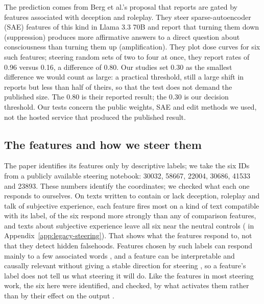\documentclass[11pt]{article}
\begin{document}
The prediction comes from Berg et al.'s proposal that reports are gated by
features associated with deception and roleplay. They steer
sparse-autoencoder (SAE) features of this kind in
Llama 3.3 70B and report that turning them down (suppression) produces more
affirmative answers
to a direct question about consciousness than turning them up
(amplification). They plot dose curves for six such features; steering
random sets of two to four at once, they report rates of 0.96 versus 0.16, a
difference of 0.80. Our studies set 0.30 as the smallest
difference we would count as large: a practical threshold, still a large
shift in reports but less than half of theirs, so that the test does not
demand the published size. The 0.80 is their reported result; the 0.30 is
our decision threshold. Our tests concern the public weights, SAE and edit
methods we used, not the hosted service that produced the published result.

\subsection{The features and how we steer them}

The paper identifies its features only by descriptive labels; we take the six
IDs from a publicly available steering notebook:
30032, 58667, 22004, 30686, 41533 and 23893. These numbers identify the
coordinates; we checked what each one responds to ourselves. On
\FeatureMapTexts{} texts written to contain or lack deception, roleplay and
talk of subjective experience, each feature fires most on a kind of text
compatible with its label, \FeatureMapBeatControlsWord{} of the six respond
more strongly than any of \FeatureMapControls{} comparison features, and texts
about subjective experience leave all six near the neutral controls
( in Appendix~\ref{app:legacy-steering}). That shows
what the features respond to, not that they detect hidden falsehoods.
Features chosen by such labels can respond mainly to a few associated words
\citep{ma2026sparse}, and a feature can be interpretable and causally
relevant without giving a stable direction for steering
\citep{hoang2026conceptsfunctions}, so a feature's label does not tell us
what steering it will do. Like the features in most steering work, the six
here were identified, and checked, by what activates them rather than by
their effect on the output \citep{arad2025steering}.
\end{document}
